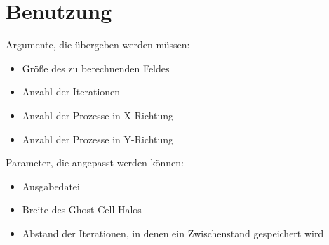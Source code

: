 \documentclass[12pt]{article}
\begin{document}
\section{Benutzung}
Argumente, die übergeben werden müssen:
\begin{itemize}
    \item Größe des zu berechnenden Feldes
    \item Anzahl der Iterationen
    \item Anzahl der Prozesse in X-Richtung
    \item Anzahl der Prozesse in Y-Richtung
\end{itemize}
Parameter, die angepasst werden können:
\begin{itemize}
    \item Ausgabedatei
    \item Breite des Ghost Cell Halos
    \item Abstand der Iterationen, in denen ein Zwischenstand gespeichert wird
\end{itemize}

\typeout{}
\clearpage
\pagestyle{empty}

\listoffigures
\listoftables
\appendix
% 
\end{document}
